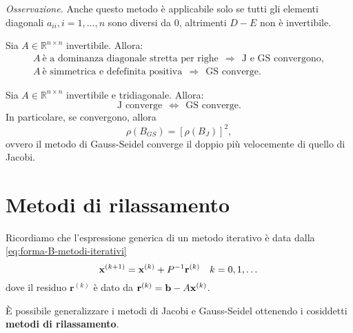 \textit{Osservazione.}
Anche questo metodo è applicabile solo se tutti gli elementi diagonali $a_{ii} ,i=1,\dotsc ,n$ sono diversi da $0$, altrimenti $D-E$ non è invertibile.
\begin{theorem}
Sia $A\in \mathbb{R}^{n\times n}$ invertibile. Allora:
\begin{gather*}
A\ \text{è a dominanza diagonale stretta per righe} \ \ \Rightarrow \ \ \text{J e GS convergono},\\
A\ \text{è simmetrica e defefinita positiva} \ \ \Rightarrow \ \ \text{GS converge}.
\end{gather*}
\end{theorem}
\begin{theorem}
Sia $A\in \mathbb{R}^{n\times n}$ invertibile e tridiagonale. Allora:
\begin{equation*}
\text{J converge} \ \ \Leftrightarrow \ \ \text{GS converge}.
\end{equation*}
In particolare, se convergono, allora
\begin{equation*}
\rho ( B_{GS}) =[ \rho ( B_{J})]^{2} ,
\end{equation*}
ovvero il metodo di Gauss-Seidel converge il doppio più velocemente di quello di Jacobi.
\end{theorem}
\section{Metodi di rilassamento}

Ricordiamo che l'espressione generica di un metodo iterativo è data dalla \eqref{eq:forma-B-metodi-iterativi}
\begin{equation*}
\mathbf{x}^{( k+1)} =\mathbf{x}^{(k)} +P^{-1}\mathbf{r}^{(k)} \quad k=0,1,\dotsc
\end{equation*}
dove il residuo $\mathbf{r}^{(k)}$ è dato da $\mathbf{r}^{(k)} =\mathbf{b} -A\mathbf{x}^{(k)}$.

È possibile generalizzare i metodi di Jacobi e Gauss-Seidel ottenendo i cosiddetti \textbf{metodi di rilassamento}.
